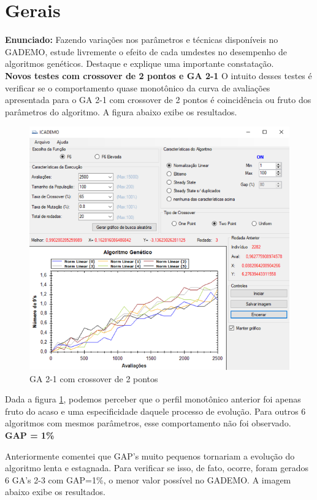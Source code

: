 \documentclass[12pt]{article}
\begin{document}
\section{Gerais}
\textbf{Enunciado:}
Fazendo variações nos parâmetros e técnicas disponíveis no GADEMO, estude livremente o efeito de cada umdestes no desempenho de algoritmos genéticos. Destaque e explique uma importante constatação.\\


\textbf{Novos testes com crossover de 2 pontos e GA 2-1}
O intuito desses testes é verificar se o comportamento quase monotônico da curva de avaliações apresentada para o GA 2-1 com crossover de 2 pontos é coincidência ou fruto dos parâmetros do algoritmo. A figura abaixo exibe os resultados.

\begin{figure}[H]
	\centering
	\includegraphics[width=0.7\linewidth]{Imagens/questao8_2pontos}
	\caption{GA 2-1 com crossover de 2 pontos}
	\label{fig:questao82pontos}
\end{figure}

Dada a figura \ref{fig:questao82pontos}, podemos perceber que o perfil monotônico anterior foi apenas fruto do acaso e uma especificidade daquele processo de evolução. Para outros 6 algoritmos com mesmos parâmetros, esse comportamento não foi observado.\\

\textbf{GAP = 1\%}

Anteriormente comentei que GAP's muito pequenos tornariam a evolução do algoritmo lenta e estagnada. Para verificar se isso, de fato, ocorre, foram gerados 6 GA's 2-3 com GAP=1\%, o menor valor possível no GADEMO. A imagem abaixo exibe os resultados.
\end{document}
